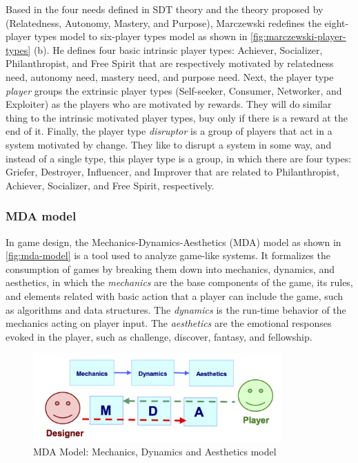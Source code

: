 Based in the four needs defined in SDT theory \cite{DeciRyan2010} and the theory proposed by  (Relatedness, Autonomy, Mastery, and Purpose), Marczewski redefines the eight-player types model to six-player types model as shown in \autoref{fig:marczewski-player-types} (b).
He defines four basic intrinsic player types: Achiever, Socializer, Philanthropist, and Free Spirit that are respectively motivated by relatedness need, autonomy need, mastery need, and purpose need.
Next, the player type \emph{player} groups the extrinsic player types (Self-seeker, Consumer, Networker, and Exploiter) as the players who are motivated by rewards.
They will do similar thing to the intrinsic motivated player types, buy only if there is a reward at the end of it.
Finally, the player type \emph{disruptor} is a group of players that act in a system motivated by change.
They like to disrupt a system in some way, and instead of a single type, this player type is a group, in which there are four types: Griefer, Destroyer, Influencer, and Improver that are related to Philanthropist, Achiever, Socializer, and Free Spirit, respectively.

\subsubsection{MDA model}
\label{subsec:mda-model-need-theories}

In game design, the Mechanics-Dynamics-Aesthetics (MDA) model \cite{HunickeLeBlancZubek2004} as shown in \autoref{fig:mda-model} is a tool used to analyze game-like systems.
It formalizes the consumption of games by breaking them down into mechanics, dynamics, and aesthetics, in which the \emph{mechanics} are the base components of the game, its rules, and elements related with basic action that a player can include the game, such as algorithms and data structures.
The \emph{dynamics} is the run-time behavior of the mechanics acting on player input. The \emph{aesthetics} are the emotional responses evoked in the player, such as challenge, discover, fantasy, and fellowship.

\begin{figure}[htb]
 \caption{MDA Model: Mechanics, Dynamics and Aesthetics model}
 \label{fig:mda-model}
 \centering
 \includegraphics[width=0.85\textwidth]{images/chap-general-background/mda-model.png}
\end{figure}

